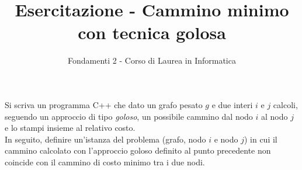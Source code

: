 \documentclass{article}
\title{Esercitazione - Cammino minimo con tecnica golosa}
\author{Fondamenti 2 - Corso di Laurea in Informatica}
\date{  }
\begin{document}
\maketitle
\noindent Si scriva un programma C++ che dato un grafo pesato $g$ e due interi $i$ e $j$ calcoli, seguendo un approccio di tipo \textit{goloso}, un possibile cammino dal nodo $i$ al nodo $j$ e lo stampi insieme al relativo costo.\\
In seguito, definire un'istanza del problema (grafo, nodo $i$ e nodo $j$) in cui il cammino calcolato con l'approccio goloso definito al punto precedente non coincide con il cammino di costo minimo tra i due nodi.
\end{document}
